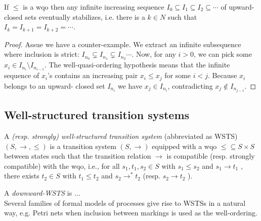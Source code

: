 \begin{lemma}  \label{upward-closed stablizes}
If $\leq$ is a wqo then any infinite increasing sequence $I_0 \subseteq I_1 \subseteq I_2 \subseteq \cdots$ of
upward-closed sets eventually stabilizes, i.e. there is a $k \in N$ such that 
$I_k = I_{k+1} = I_{k+2} = \cdots $.
\end{lemma}

\begin{proof}
Assue we have a counter-example.
We extract an infinite subsequence where
inclusion is strict: $I_{n_0} \subsetneq I_{n_1} \subsetneq I_{n_2} \cdots$. Now, for any $i>0$, we can pick some $x_i \in I_{n_i} \setminus I_{n_{i-1}}$. The well-quasi-ordering hypothesis means that the infinite sequence of $x_i$'s
contains an increasing pair $x_i \leq x_j$ for some $i<j$. Because $x_i$ belongs to an upward-
closed set $I_{n_i}$ we have $x_j \in I_{n_i} $, contradicting $x_j \not\in I_{n_{ j - 1}}$.
\end{proof}




\subsection{Well-structured transition systems}


\begin{definition}\cite{DBLP:journals/tcs/FinkelS01}
A {\em (resp. strongly) well-structured transition system} (abbreviated as WSTS)  $(S, \rightarrow, \leq)$
is a transition system $(S, \rightarrow)$
equipped with a wqo ${\leq} \subseteq S \times S$ between states such that  
the transition relation $ \rightarrow$ is compatible (resp. strongly compatible) with the wqo, i.e., for all 
$s_1, t_1 , s_2 \in S$
	with $s_1 \leq s_2$  and $s_1 \rightarrow t_1$ , there exists 
	$t_2 \in S$ with 
	$t_1 \leq t_2$ and $s_2 \rightarrow^{*} t_2$ 			
				(resp. $s_2 \rightarrow t_2$ ).
\end{definition}

A \emph{downward-WSTS} is ... \\

Several families of formal models of processes give rise to WSTSs in a natural way, e.g. Petri nets when inclusion between markings is used as the well-ordering.


